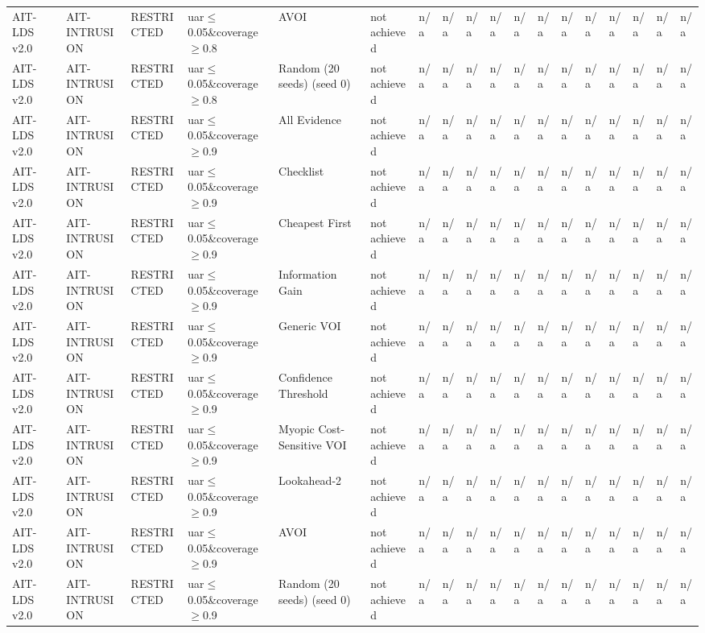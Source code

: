\begin{table}[!ht]
{\begin{tabular}{llllllllllllllllll}
AIT-LDS v2.0 & AIT-INTRUSION & RESTRICTED & uar$\le$0.05\&coverage$\ge$0.8 & AVOI & not achieved & n/a & n/a & n/a & n/a & n/a & n/a & n/a & n/a & n/a & n/a & n/a & n/a \\
AIT-LDS v2.0 & AIT-INTRUSION & RESTRICTED & uar$\le$0.05\&coverage$\ge$0.8 & Random (20 seeds) (seed 0) & not achieved & n/a & n/a & n/a & n/a & n/a & n/a & n/a & n/a & n/a & n/a & n/a & n/a \\
AIT-LDS v2.0 & AIT-INTRUSION & RESTRICTED & uar$\le$0.05\&coverage$\ge$0.9 & All Evidence & not achieved & n/a & n/a & n/a & n/a & n/a & n/a & n/a & n/a & n/a & n/a & n/a & n/a \\
AIT-LDS v2.0 & AIT-INTRUSION & RESTRICTED & uar$\le$0.05\&coverage$\ge$0.9 & Checklist & not achieved & n/a & n/a & n/a & n/a & n/a & n/a & n/a & n/a & n/a & n/a & n/a & n/a \\
AIT-LDS v2.0 & AIT-INTRUSION & RESTRICTED & uar$\le$0.05\&coverage$\ge$0.9 & Cheapest First & not achieved & n/a & n/a & n/a & n/a & n/a & n/a & n/a & n/a & n/a & n/a & n/a & n/a \\
AIT-LDS v2.0 & AIT-INTRUSION & RESTRICTED & uar$\le$0.05\&coverage$\ge$0.9 & Information Gain & not achieved & n/a & n/a & n/a & n/a & n/a & n/a & n/a & n/a & n/a & n/a & n/a & n/a \\
AIT-LDS v2.0 & AIT-INTRUSION & RESTRICTED & uar$\le$0.05\&coverage$\ge$0.9 & Generic VOI & not achieved & n/a & n/a & n/a & n/a & n/a & n/a & n/a & n/a & n/a & n/a & n/a & n/a \\
AIT-LDS v2.0 & AIT-INTRUSION & RESTRICTED & uar$\le$0.05\&coverage$\ge$0.9 & Confidence Threshold & not achieved & n/a & n/a & n/a & n/a & n/a & n/a & n/a & n/a & n/a & n/a & n/a & n/a \\
AIT-LDS v2.0 & AIT-INTRUSION & RESTRICTED & uar$\le$0.05\&coverage$\ge$0.9 & Myopic Cost-Sensitive VOI & not achieved & n/a & n/a & n/a & n/a & n/a & n/a & n/a & n/a & n/a & n/a & n/a & n/a \\
AIT-LDS v2.0 & AIT-INTRUSION & RESTRICTED & uar$\le$0.05\&coverage$\ge$0.9 & Lookahead-2 & not achieved & n/a & n/a & n/a & n/a & n/a & n/a & n/a & n/a & n/a & n/a & n/a & n/a \\
AIT-LDS v2.0 & AIT-INTRUSION & RESTRICTED & uar$\le$0.05\&coverage$\ge$0.9 & AVOI & not achieved & n/a & n/a & n/a & n/a & n/a & n/a & n/a & n/a & n/a & n/a & n/a & n/a \\
AIT-LDS v2.0 & AIT-INTRUSION & RESTRICTED & uar$\le$0.05\&coverage$\ge$0.9 & Random (20 seeds) (seed 0) & not achieved & n/a & n/a & n/a & n/a & n/a & n/a & n/a & n/a & n/a & n/a & n/a & n/a \\

\end{tabular}}
\end{table}
